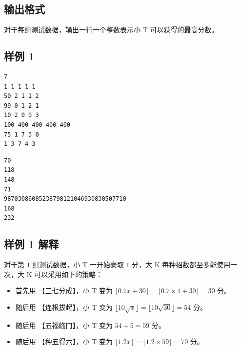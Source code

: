 \subsection{输出格式}

对于每组测试数据，输出一行一个整数表示小 T 可以获得的最高分数。

\subsection{样例 1}

\begin{minipage}{\linewidth}
	\begin{minipage}[t]{0.49\linewidth}
		\begin{lstlisting}[title=\texttt{standard input}]
7
1 1 1 1 1
50 2 1 1 2
99 0 1 2 1
10 2 0 0 3
100 400 400 400 400
75 1 7 3 0
1 3 7 4 3
\end{lstlisting}
	\end{minipage}
	\begin{minipage}[t]{0.49\linewidth}
		\begin{lstlisting}[title=\texttt{standard output}]
70
118
148
71
98703086085238798121046930830507710
168
232
\end{lstlisting}
	\end{minipage}
\end{minipage}


\subsection{样例 1 解释}

对于第 $1$ 组测试数据，小 T 一开始豪取 $1$ 分，大 K 每种招数都至多能使用一次，大 K 可以采用如下的策略：

\begin{itemize}
	\item 首先用 【三七分成】，小 T 变为 $\lfloor 0.7x+30 \rfloor = \lfloor 0.7 \times 1 +30 \rfloor = 30$ 分。
	\item 随后用 【连根拔起】，小 T 变为 $\lfloor 10\sqrt{x} \rfloor = \lfloor 10\sqrt{30} \rfloor = 54$ 分。
	\item 随后用 【五福临门】，小 T 变为 $54 + 5 = 59$ 分。
	\item 随后用 【种五得六】，小 T 变为 $\lfloor 1.2x \rfloor = \lfloor 1.2 \times 59 \rfloor = 70$ 分。
\end{itemize}






